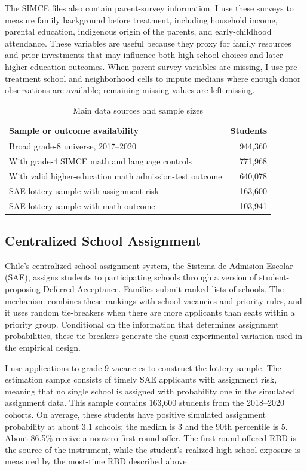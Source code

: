 \documentclass[a4paper, article, english, oneside, unknownkeysallowed, 12pt]{memoir}
\begin{document}
The SIMCE files also contain parent-survey information. I use these surveys to measure family background before treatment, including household income, parental education, indigenous origin of the parents, and early-childhood attendance. These variables are useful because they proxy for family resources and prior investments that may influence both high-school choices and later higher-education outcomes. When parent-survey variables are missing, I use pre-treatment school and neighborhood cells to impute medians where enough donor observations are available; remaining missing values are left missing.

\begin{table}[H]
\centering
\caption{Main data sources and sample sizes}
\label{tab:data-samples}
\begin{tabular}{lr}
\toprule
Sample or outcome availability & Students \\
\midrule
Broad grade-8 universe, 2017--2020 & 944,360 \\
With grade-4 SIMCE math and language controls & 771,968 \\
With valid higher-education math admission-test outcome & 640,078 \\
\midrule
SAE lottery sample with assignment risk & 163,600 \\
SAE lottery sample with math outcome & 103,941 \\
\bottomrule
\end{tabular}
\end{table}

\subsection{Centralized School Assignment}

Chile's centralized school assignment system, the Sistema de Admision Escolar (SAE), assigns students to participating schools through a version of student-proposing Deferred Acceptance. Families submit ranked lists of schools. The mechanism combines these rankings with school vacancies and priority rules, and it uses random tie-breakers when there are more applicants than seats within a priority group. Conditional on the information that determines assignment probabilities, these tie-breakers generate the quasi-experimental variation used in the empirical design.

I use applications to grade-9 vacancies to construct the lottery sample. The estimation sample consists of timely SAE applicants with assignment risk, meaning that no single school is assigned with probability one in the simulated assignment data. This sample contains 163,600 students from the 2018--2020 cohorts. On average, these students have positive simulated assignment probability at about 3.1 schools; the median is 3 and the 90th percentile is 5. About 86.5\% receive a nonzero first-round offer. The first-round offered RBD is the source of the instrument, while the student's realized high-school exposure is measured by the most-time RBD described above.
\end{document}
